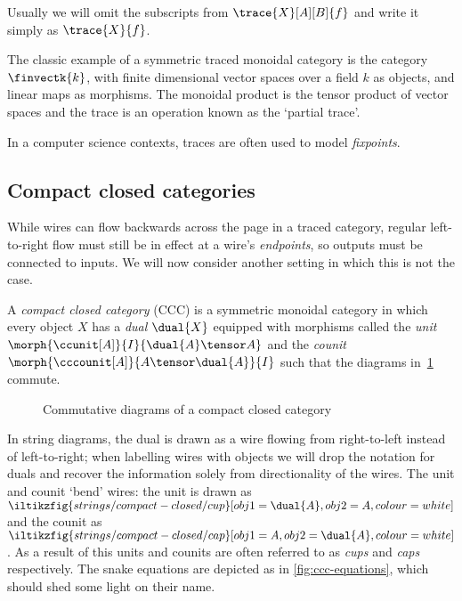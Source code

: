 Usually we will omit the subscripts from \(\trace{X}[A][B]{f}\) and write it
simply as \(\trace{X}{f}\).



\begin{example}
    The classic example of a symmetric traced monoidal category is the category
    \(\finvectk{k}\), with finite dimensional vector spaces over a field \(k\)
    as objects, and linear maps as morphisms.
    The monoidal product is the tensor product of vector spaces and the
    trace is an operation known as the `partial trace'.
\end{example}

In a computer science contexts, traces are often used to model \emph{fixpoints}.

\subsection{Compact closed categories}

While wires can flow backwards across the page in a traced category, regular
left-to-right flow must still be in effect at a wire's \emph{endpoints}, so
outputs must be connected to inputs.
We will now consider another setting in which this is not the case.

\begin{definition}
    A \emph{compact closed category} (CCC) is a symmetric monoidal category in
    which every object \(X\) has a \emph{dual} \(\dual{X}\) equipped with
    morphisms called the \emph{unit} \(
    \morph{\ccunit[A]}{I}{\dual{A} \tensor A}
    \) and the \emph{counit} \(
    \morph{\cccounit[A]}{A \tensor \dual{A}}{I}
    \) such that the diagrams in~\cref{fig:snake-equations} commute.
\end{definition}

\begin{figure}
    \centering
    
    \quad
    
    \caption{Commutative diagrams of a compact closed category}
    \label{fig:snake-equations}
\end{figure}

In string diagrams, the dual is drawn as a wire flowing from right-to-left
instead of left-to-right; when labelling wires with objects we will drop the
notation for duals and recover the information solely from directionality of the
wires.
The unit and counit `bend' wires: the unit is drawn as \(
\iltikzfig{strings/compact-closed/cup}[obj1=\dual{A},obj2=A,colour=white]
\) and the counit as \(
\iltikzfig{strings/compact-closed/cap}[obj1=A,obj2=\dual{A},colour=white]
\).
As a result of this units and counits are often referred to as \emph{cups} and
\emph{caps} respectively.
The snake equations are depicted as in \cref{fig:ccc-equations}, which
should shed some light on their name.


